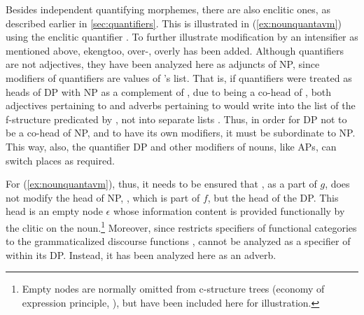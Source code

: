 Besides independent quantifying morphemes, there are also enclitic ones, as
described earlier in \autoref{sec:quantifiers}.
This is illustrated in (\ref{ex:nounquantavm}) using the
enclitic quantifier . To
further illustrate modification by an intensifier as mentioned above, 
{ekeng}{too, over-, overly} has been added. Although quantifiers are not
adjectives, they have been analyzed here as adjuncts of NP, since modifiers of
quantifiers are values of \Quant{}'s \Adjc{} list. That is, if quantifiers were
treated as heads of DP with NP as a complement of , due to 
being a co-head of , both adjectives pertaining to  and
adverbs pertaining to  would write into the \Adjc{} list of the
f-structure predicated by , not into separate lists \citep[106]
{bresnan2016}. Thus, in order for DP not to be a co-head of NP, and to have its
own modifiers, it must be subordinate to NP. This way, also, the quantifier DP
and other modifiers of nouns, like APs, can switch places as required.

For (\ref{ex:nounquantavm}), thus, it needs to be ensured that
, as a part of $g$, does not modify the head of NP, 
, which is part of $f$, but the head of the DP. This
head is an empty node $\epsilon$ whose information content is provided
functionally by the clitic  on the noun.\footnote{Empty
nodes are normally omitted from c-structure trees (economy of expression
principle, \cite [119--124]{bresnan2016}), but have been included
here for illustration.} Moreover, since \Lfg{} restricts specifiers
of functional categories to the grammaticalized discourse functions
\citep[106--107]{bresnan2016},  cannot be analyzed as a
specifier of  within its DP. Instead, it has been analyzed here as an
adverb.

